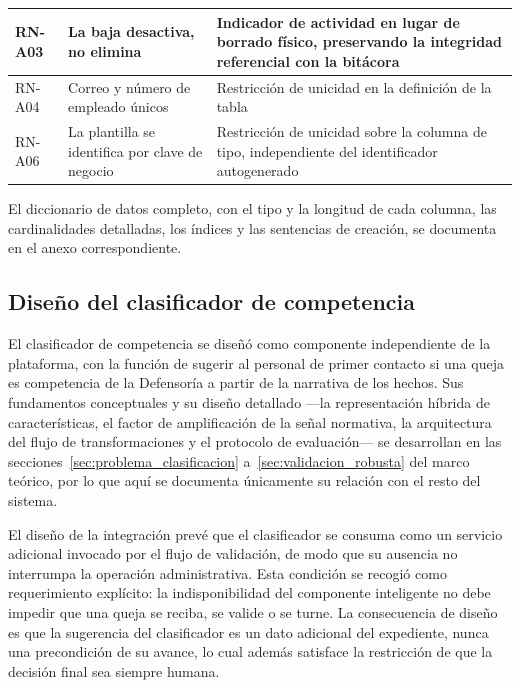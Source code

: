 \begin{longtable}{|p{1.9cm}|p{5.6cm}|p{6.6cm}|}
		RN-A03 & La baja desactiva, no elimina & Indicador de actividad en lugar de borrado físico,
		preservando la integridad referencial con la bitácora \\ \hline
	
		RN-A04 & Correo y número de empleado únicos & Restricción de unicidad en la definición de la
		tabla \\ \hline
	
		RN-A06 & La plantilla se identifica por clave de negocio & Restricción de unicidad sobre la
		columna de tipo, independiente del identificador autogenerado \\ \hline
	\end{longtable}
	
	\normalsize
	\setlength{\tabcolsep}{6pt}
	\renewcommand{\arraystretch}{1}
	
	El diccionario de datos completo, con el tipo y la longitud de cada columna, las cardinalidades
	detalladas, los índices y las sentencias de creación, se documenta en el anexo correspondiente.
	
	\subsection{Diseño del clasificador de competencia}
	\label{sec:diseno_clasificador}
	El clasificador de competencia se diseñó como componente independiente de la plataforma, con la
	función de sugerir al personal de primer contacto si una queja es competencia de la Defensoría a
	partir de la narrativa de los hechos. Sus fundamentos conceptuales y su diseño detallado
	---la representación híbrida de características, el factor de amplificación de la señal
	normativa, la arquitectura del flujo de transformaciones y el protocolo de evaluación--- se
	desarrollan en las secciones~\ref{sec:problema_clasificacion} a~\ref{sec:validacion_robusta} del
	marco teórico, por lo que aquí se documenta únicamente su relación con el resto del sistema.
	
	El diseño de la integración prevé que el clasificador se consuma como un servicio adicional
	invocado por el flujo de validación, de modo que su ausencia no interrumpa la operación
	administrativa. Esta condición se recogió como requerimiento explícito: la indisponibilidad del
	componente inteligente no debe impedir que una queja se reciba, se valide o se turne. La
	consecuencia de diseño es que la sugerencia del clasificador es un dato adicional del
	expediente, nunca una precondición de su avance, lo cual además satisface la restricción de que
	la decisión final sea siempre humana.
	
